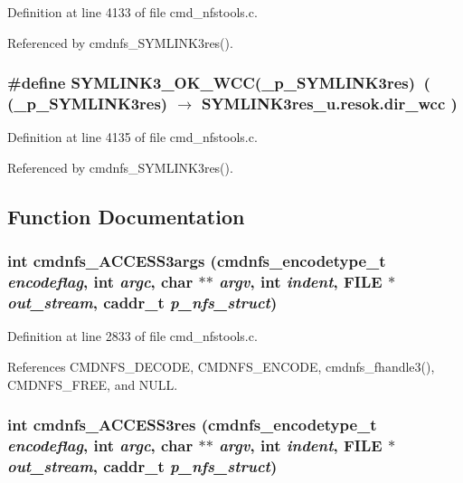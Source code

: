 Definition at line 4133 of file cmd\_\-nfstools.c.

Referenced by cmdnfs\_\-SYMLINK3res().
\subsubsection{\setlength{\rightskip}{0pt plus 5cm}\#define SYMLINK3\_\-OK\_\-WCC(\_\-p\_\-SYMLINK3res)\ ( (\_\-p\_\-SYMLINK3res) $\rightarrow$ SYMLINK3res\_\-u.resok.dir\_\-wcc )}\label{cmd__nfstools_8c_a49}




Definition at line 4135 of file cmd\_\-nfstools.c.

Referenced by cmdnfs\_\-SYMLINK3res().

\subsection{Function Documentation}
\subsubsection{\setlength{\rightskip}{0pt plus 5cm}int cmdnfs\_\-ACCESS3args ({\bf cmdnfs\_\-encodetype\_\-t} {\em encodeflag}, int {\em argc}, char $\ast$$\ast$ {\em argv}, int {\em indent}, FILE $\ast$ {\em out\_\-stream}, caddr\_\-t {\em p\_\-nfs\_\-struct})}\label{cmd__nfstools_8c_a98}




Definition at line 2833 of file cmd\_\-nfstools.c.

References CMDNFS\_\-DECODE, CMDNFS\_\-ENCODE, cmdnfs\_\-fhandle3(), CMDNFS\_\-FREE, and NULL.
\subsubsection{\setlength{\rightskip}{0pt plus 5cm}int cmdnfs\_\-ACCESS3res ({\bf cmdnfs\_\-encodetype\_\-t} {\em encodeflag}, int {\em argc}, char $\ast$$\ast$ {\em argv}, int {\em indent}, FILE $\ast$ {\em out\_\-stream}, caddr\_\-t {\em p\_\-nfs\_\-struct})}\label{cmd__nfstools_8c_a99}




